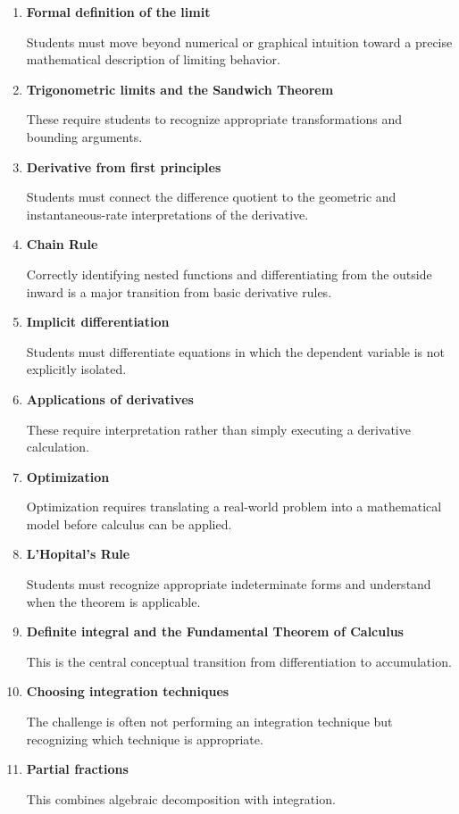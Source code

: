 \documentclass[11pt]{article}
\begin{document}
\begin{enumerate}
    \item \textbf{Formal definition of the limit}

    Students must move beyond numerical or graphical intuition toward a precise
    mathematical description of limiting behavior.

    \item \textbf{Trigonometric limits and the Sandwich Theorem}

    These require students to recognize appropriate transformations and
    bounding arguments.

    \item \textbf{Derivative from first principles}

    Students must connect the difference quotient to the geometric and
    instantaneous-rate interpretations of the derivative.

    \item \textbf{Chain Rule}

    Correctly identifying nested functions and differentiating from the
    outside inward is a major transition from basic derivative rules.

    \item \textbf{Implicit differentiation}

    Students must differentiate equations in which the dependent variable is
    not explicitly isolated.

    \item \textbf{Applications of derivatives}

    These require interpretation rather than simply executing a derivative
    calculation.

    \item \textbf{Optimization}

    Optimization requires translating a real-world problem into a mathematical
    model before calculus can be applied.

    \item \textbf{L'Hopital's Rule}

    Students must recognize appropriate indeterminate forms and understand
    when the theorem is applicable.

    \item \textbf{Definite integral and the Fundamental Theorem of Calculus}

    This is the central conceptual transition from differentiation to
    accumulation.

    \item \textbf{Choosing integration techniques}

    The challenge is often not performing an integration technique but
    recognizing which technique is appropriate.

    \item \textbf{Partial fractions}

    This combines algebraic decomposition with integration.
\end{enumerate}
\end{document}
